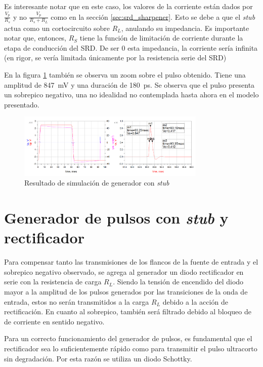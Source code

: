 Es interesante notar que en este caso, los valores de la corriente están dados
por $\frac{V_p}{R_s}$ y no $\frac{V_p}{R_s+R_L}$ como en la sección
\ref{sec:srd_sharpener}. Esto se debe a que el \textit{stub} actua como un
cortocircuito sobre $R_L$, anulando su impedancia. Es importante notar que,
entonces, $R_S$ tiene la función de limitación de corriente durante la etapa
de conducción del SRD. De ser $0$ esta impedancia, la corriente sería infinita
(en rigor, se vería limitada únicamente por la resistencia serie del SRD)

En la figura \ref{fig:stub_generator_sim_result} también se observa un zoom sobre el
pulso obtenido. Tiene una amplitud de \qty{847}{\milli\volt} y una duración de
\qty{180}{\pico\second}. Se observa que el pulso presenta un sobrepico negativo,
una no idealidad no contemplada hasta ahora en el modelo presentado.

\begin{figure}[t!]
    \centering
    \includegraphics[width=0.8\textwidth]{images/stub_generator_sim_result.png}
    \caption{Resultado de simulación de generador con \textit{stub}}
    \label{fig:stub_generator_sim_result}
\end{figure}

\section{Generador de pulsos con \textit{stub} y rectificador}

Para compensar tanto las transmisiones de los flancos de la fuente de entrada y
el sobrepico negativo observado, se agrega al generador un diodo rectificador en
serie con la resistencia de carga $R_L$. Siendo la tensión de encendido del
diodo mayor a la amplitud de los pulsos generados por las transiciones de la
onda de entrada, estos no serán transmitidos a la carga $R_L$ debido a la acción
de rectificación. En cuanto al sobrepico, también será filtrado debido al
bloqueo de de corriente en sentido negativo.

Para un correcto funcionamiento del generador de pulsos, es fundamental que el
rectificador sea lo suficientemente rápido como para transmitir el pulso
ultracorto sin degradación. Por esta razón se utiliza un diodo Schottky.

